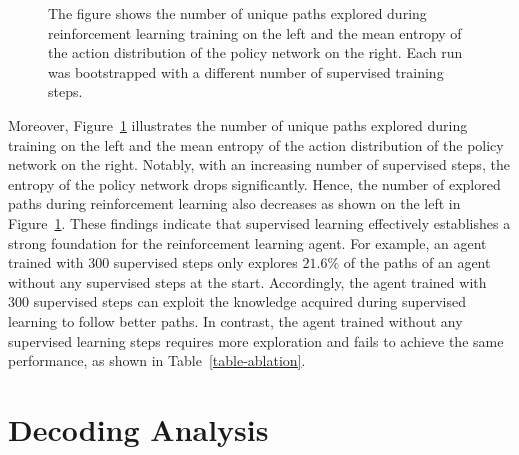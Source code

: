 \begin{figure}[ht]
\begin{minipage}{.45\linewidth}
	\end{minipage}
	\caption{The figure shows the number of unique paths explored during reinforcement learning training on the left and the mean entropy of the action distribution of the policy network on the right. Each run was bootstrapped with a different number of supervised training steps.}
	\label{figure-supervised-entropy}
  \end{figure}
Moreover, Figure~\ref{figure-supervised-entropy} illustrates the number of unique paths explored during training on the left and
the mean entropy of the action distribution of the policy network on the right. Notably, with an increasing number 
of supervised steps, the entropy of the policy network drops significantly.
Hence, the number of explored paths during reinforcement learning also decreases as shown on the left in Figure~\ref{figure-supervised-entropy}.
These findings indicate that supervised learning
effectively establishes a strong foundation for the reinforcement learning agent.
For example, an agent trained with 300 supervised steps only explores $21.6\%$ of the paths of 
an agent without any supervised steps at the start.
Accordingly, the agent trained with 300 supervised steps can exploit the knowledge acquired during supervised learning to follow better paths.
In contrast, the agent trained without any supervised learning steps requires more exploration and fails to achieve the same performance, 
as shown in Table~\ref{table-ablation}.


%


\section{Decoding Analysis}
\label{sec:decoding-analysis}

